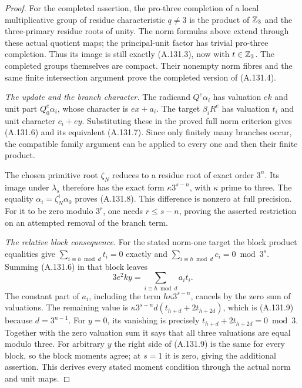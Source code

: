 \begin{proof}
For the completed assertion, the pro-three
completion of a local multiplicative group of
residue characteristic \(q\ne3\) is the product
of \(\mathbb Z_3\) and the three-primary residue roots
of unity.  The norm formulas above extend through
these actual quotient maps; the principal-unit
factor has trivial pro-three completion.
Thus its image is still exactly (A.131.3), now
with \(t\in\mathbb Z_3\).
The completed groups themselves are compact.
Their nonempty norm fibres and the same finite
intersection argument prove the completed version
of (A.131.4).

\emph{The update and the branch character.}
The radicand \(Q^e\alpha_i\) has valuation \(ek\)
and unit part \(Q_0^e\alpha_i\), whose character is
\(ex+a_i\).
The target \(\beta_iR^e\) has valuation \(t_i\)
and unit character \(c_i+ey\).
Substituting these in the proved full norm criterion
gives (A.131.6) and its equivalent (A.131.7).
Since only finitely many branches occur, the
compatible family argument can be applied to every
one and then their finite product.

The chosen primitive root \(\zeta_N\) reduces
to a residue root of exact order \(3^n\).
Its image under \(\lambda_s\) therefore has
the exact form \(\kappa3^{s-n}\), with \(\kappa\)
prime to three.  The equality
\(\alpha_i=\zeta_N^i\alpha_0\) proves (A.131.8).
This difference is nonzero at full precision.
For it to be zero modulo \(3^r\), one needs
\(r\le s-n\), proving the asserted restriction
on an attempted removal of the branch term.

\emph{The relative block consequence.}
For the stated norm-one target the block product
equalities give
\(\sum_{i\equiv h\bmod d}t_i=0\) exactly and
\(\sum_{i\equiv h\bmod d}c_i=0\bmod3^s\).
Summing (A.131.6) in that block leaves
\[
             3e^2ky=\sum_{i\equiv h\bmod d}a_it_i.
 \tag{A.131.13}
\]
The constant part of \(a_i\), including the term
\(h\kappa3^{s-n}\), cancels by the zero sum of
valuations.  The remaining value is
\(\kappa3^{s-n}d(t_{h+d}+2t_{h+2d})\), which is
(A.131.9) because \(d=3^{n-1}\).
For \(y=0\), its vanishing is precisely
\(t_{h+d}+2t_{h+2d}=0\bmod3\).
Together with the zero valuation sum it says
that all three valuations are equal modulo three.
For arbitrary \(y\) the right side of (A.131.9)
is the same for every block, so the block moments
agree; at \(s=1\) it is zero, giving the additional
assertion.  This derives every stated moment
condition through the actual norm and unit maps.


\end{proof}
